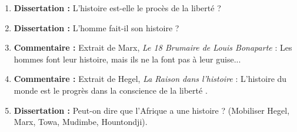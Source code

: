 \documentclass[11pt]{article}
\begin{document}
\begin{exercice}
\begin{enumerate}
\item \textbf{Dissertation :} \guillemotleft L'histoire est-elle le procès de la liberté ? \guillemotright
\item \textbf{Dissertation :} \guillemotleft L'homme fait-il son histoire ? \guillemotright
\item \textbf{Commentaire :} Extrait de Marx, \emph{Le 18 Brumaire de Louis Bonaparte} : \guillemotleft Les hommes font leur histoire, mais ils ne la font pas à leur guise... \guillemotright
\item \textbf{Commentaire :} Extrait de Hegel, \emph{La Raison dans l'histoire} : \guillemotleft L'histoire du monde est le progrès dans la conscience de la liberté \guillemotright.
\item \textbf{Dissertation :} \guillemotleft Peut-on dire que l'Afrique a une histoire ? \guillemotright (Mobiliser Hegel, Marx, Towa, Mudimbe, Hountondji).
\end{enumerate}
\end{exercice}
\end{document}
